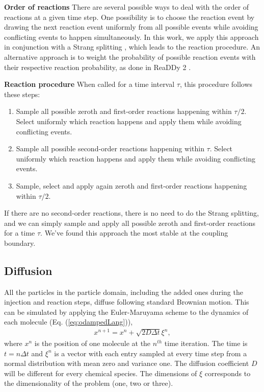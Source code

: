 \documentclass[10pt,twocolumn]{revtex4-1}
\begin{document}
	\textbf{Order of reactions}
	There are several possible ways to deal with the order of reactions at a given time step. One possibility is to choose the reaction event by drawing the next reaction event uniformly from all possible events while avoiding conflicting events to happen simultaneously. In this work, we apply this approach in conjunction with a Strang splitting \cite{strangsplitting}, which leads to the reaction procedure. An alternative approach is to weight the probability of possible reaction events with their respective reaction probability, as done in ReaDDy 2 \cite{hoffmann2019readdy}.
	
	\textbf{Reaction procedure}
	When called for a time interval $\tau$, this procedure follows these steps: 
	\begin{enumerate}
		\item Sample all possible zeroth and first-order reactions happening within $\tau/2$. Select uniformly which reaction happens and apply them while avoiding conflicting events.
		\item Sample all possible second-order reactions happening within $\tau$. Select uniformly which reaction happens and apply them while avoiding conflicting events.
		\item Sample, select and apply again zeroth and first-order reactions happening within $\tau/2$.
	\end{enumerate}
	
	If there are no second-order reactions, there is no need to do the Strang splitting, and we can simply sample and apply all possible zeroth and first-order reactions for a time $\tau$. We've found this approach the most stable at the coupling boundary.  
	
	\subsection{Diffusion}
	All the particles in the particle domain, including the added ones during the injection and reaction steps, diffuse following standard Brownian motion. This can be simulated by applying the Euler-Maruyama scheme \cite{higham2001algorithmic} to the dynamics of each molecule (Eq. (\ref{eq:odampedLang})),
	\begin{align}
	x^{n+1}=x^n +\sqrt{2D\Delta t} \xi^n,
	\label{eq:eulermaruyama}
	\end{align}
	where $x^n$ is the position of one molecule at the $n^{th}$ time iteration. The time is $t=n\Delta t$ and $\xi^n$ is a vector with each entry sampled at every time step from a normal distribution with mean zero and variance one. The diffusion coefficient $D$ will be different for every chemical species. The dimensions of $\xi$ corresponds to the dimensionality of the problem (one, two or three). 
	
\end{document}
